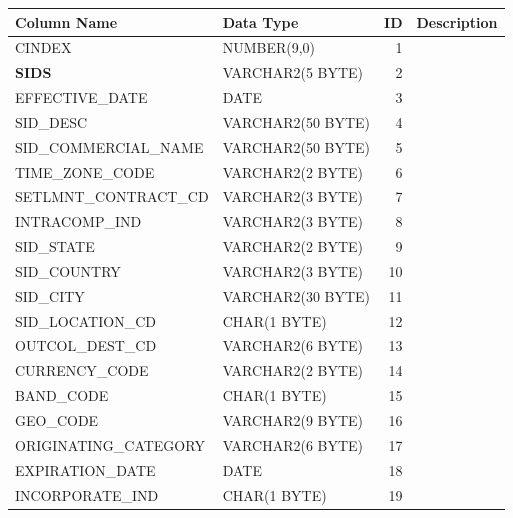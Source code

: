\documentclass[12pt,twoside]{article}
\begin{document}
\begin{center}
\begin{tabular}{llrl}
\hline
 \textbf{Column Name}   &  \textbf{Data Type}  &  \textbf{ID}  &  \textbf{Description}  \\
\hline
 CINDEX                 &  NUMBER(9,0)         &            1  &                        \\
 \textbf{SIDS}          &  VARCHAR2(5 BYTE)    &            2  &                        \\
 EFFECTIVE\_DATE        &  DATE                &            3  &                        \\
 SID\_DESC              &  VARCHAR2(50 BYTE)   &            4  &                        \\
 SID\_COMMERCIAL\_NAME  &  VARCHAR2(50 BYTE)   &            5  &                        \\
 TIME\_ZONE\_CODE       &  VARCHAR2(2 BYTE)    &            6  &                        \\
 SETLMNT\_CONTRACT\_CD  &  VARCHAR2(3 BYTE)    &            7  &                        \\
 INTRACOMP\_IND         &  VARCHAR2(3 BYTE)    &            8  &                        \\
 SID\_STATE             &  VARCHAR2(2 BYTE)    &            9  &                        \\
 SID\_COUNTRY           &  VARCHAR2(3 BYTE)    &           10  &                        \\
 SID\_CITY              &  VARCHAR2(30 BYTE)   &           11  &                        \\
 SID\_LOCATION\_CD      &  CHAR(1 BYTE)        &           12  &                        \\
 OUTCOL\_DEST\_CD       &  VARCHAR2(6 BYTE)    &           13  &                        \\
 CURRENCY\_CODE         &  VARCHAR2(2 BYTE)    &           14  &                        \\
 BAND\_CODE             &  CHAR(1 BYTE)        &           15  &                        \\
 GEO\_CODE              &  VARCHAR2(9 BYTE)    &           16  &                        \\
 ORIGINATING\_CATEGORY  &  VARCHAR2(6 BYTE)    &           17  &                        \\
 EXPIRATION\_DATE       &  DATE                &           18  &                        \\
 INCORPORATE\_IND       &  CHAR(1 BYTE)        &           19  &                        \\
\hline
\end{tabular}
\end{center}
\end{document}
